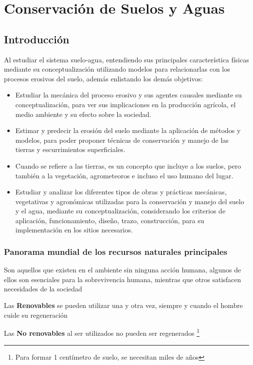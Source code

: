 \chapter{Conservación de Suelos y Aguas}
\section{Introducción}
Al estudiar el sistema suelo-agua, entendiendo sus principales característica físicas mediante su conceptualización utilizando modelos para relacionarlas con los procesos erosivos del suelo, además enlistando los demás objetivos:
\begin{itemize}
    \item Estudiar la mecánica del proceso erosivo y sus agentes causales mediante su conceptualización, para ver sus implicaciones en la producción agrícola, el medio ambiente y su efecto sobre la sociedad.
    \item Estimar y predecir la erosión del suelo mediante la aplicación de métodos y modelos, para poder proponer técnicas de conservación y manejo de las tierras y escurrimientos superficiales.
    \item Cuando se refiere a las tierras, es un concepto que incluye a los suelos, pero también a la vegetación, agrometeoros e incluso el uso humano del lugar.
    \item Estudiar y analizar los diferentes tipos de obras y prácticas mecánicas, vegetativas y agronómicas utilizadas para la conservación y manejo del suelo y el agua, mediante su conceptualización, considerando los criterios de aplicación, funcionamiento, diseño, trazo, construcción, para su implementación en los sitios necesarios.
\end{itemize}
\subsection{Panorama mundial de los recursos naturales principales}

\begin{definition}
Son aquellos que existen en el ambiente sin ninguna acción humana, algunos de ellos son esenciales para la sobrevivencia humana, mientras que otros satisfacen necesidades de la sociedad

Las \textbf{Renovables} se pueden utilizar una y otra vez, siempre y cuando el hombre cuide su regeneración

Las \textbf{No renovables} al ser utilizados no pueden ser regenerados \footnote{Para formar 1 centímetro de suelo, se necesitan miles de años}
\end{definition}

